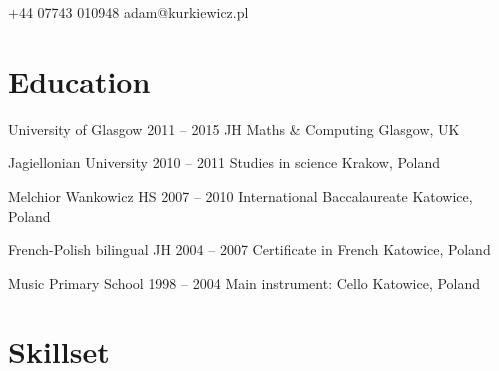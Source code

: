 \documentclass{tccv}
\begin{document}
\begin{eventlist}
\end{eventlist}

    {+44 07743 010948}
    {adam@kurkiewicz.pl}

\section{Education}

\begin{yearlist}

\item[University of Glasgow]
     {2011 -- 2015}
     {JH Maths \& Computing}
     {Glasgow, UK}

\item[Jagiellonian University]
     {2010 -- 2011}
     {Studies in science}
     {Krakow, Poland}

\item[Melchior Wankowicz HS]
     {2007 -- 2010}
     {International Baccalaureate}
     {Katowice, Poland}

\item[French-Polish bilingual JH]
     {2004 -- 2007}
     {Certificate in French}
     {Katowice, Poland}
\item[Music Primary School]
     {1998 -- 2004}
     {Main instrument: Cello}
     {Katowice, Poland}

\end{yearlist}

\section{Skillset}
\end{document}
